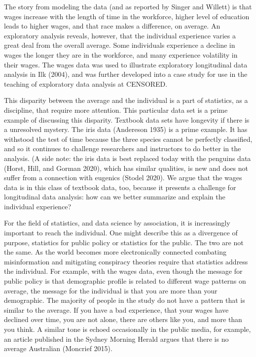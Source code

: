 \documentclass{article}
\begin{document}
The story from modeling the data (and as reported by Singer and Willett) is that wages increase with the length of time in the workforce, higher level of education leads to higher wages, and that race makes a difference, on average. An exploratory analysis reveals, however, that the individual experience varies a great deal from the overall average. Some individuals experience a decline in wages the longer they are in the workforce, and many experience volatility in their wages. The wages data was used to illustrate exploratory longitudinal data analysis in Ilk (2004), and was further developed into a case study for use in the teaching of exploratory data analysis at CENSORED.

This disparity between the average and the individual is a part of statistics, as a discipline, that require more attention. This particular data set is a prime example of discussing this disparity. Textbook data sets have longevity if there is a unresolved mystery. The iris data (Andereson 1935) is a prime example. It has withstood the test of time because the three species cannot be perfectly classified, and so it continues to challenge researchers and instructors to do better in the analysis. (A side note: the iris data is best replaced today with the penguins data (Horst, Hill, and Gorman 2020), which has similar qualities, is new and does not suffer from a connection with eugenics (Stodel 2020). We argue that the wages data is in this class of textbook data, too, because it presents a challenge for longitudinal data analysis: how can we better summarize and explain the individual experience?

For the field of statistics, and data science by association, it is increasingly important to reach the individual. One might describe this as a divergence of purpose, statistics for public policy or statistics for the public. The two are not the same. As the world becomes more electronically connected combating misinformation and mitigating conspiracy theories require that statistics address the individual. For example, with the wages data, even though the message for public policy is that demographic profile is related to different wage patterns on average, the message for the individual is that you are more than your demographic. The majority of people in the study do not have a pattern that is similar to the average. If you have a bad experience, that your wages have declined over time, you are not alone, there are others like you, and more than you think. A similar tone is echoed occasionally in the public media, for example, an article published in the Sydney Morning Herald argues that there is no average Australian (Moncrief 2015).
\end{document}
